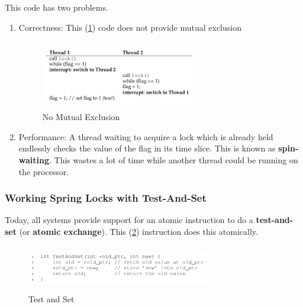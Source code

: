 This code has two problems.\\

\begin{enumerate}
    \item Correctness: This (\ref{282}) code does not provide mutual exclusion
        \begin{figure}[h!]
            \label{282}
            \begin{center}
                \includegraphics[width=7cm, height=3cm]{img/282.png}
                \caption{No Mutual Exclusion}
            \end{center}
        \end{figure}

    \item Performance: A thread waiting to acquire a lock which is already held
        endlessly checks the value of the flag in its time slice. This is known
        as \textbf{spin-waiting}. This wastes a lot of time while another thread
        could be running on the processor.
\end{enumerate}

\subsubsection{Working Spring Locks with Test-And-Set}

Today, all systems provide support for an atomic instruction to do a
\textbf{test-and-set} (or \textbf{atomic exchange}). This (\ref{testandset})
instruction does this atomically.

\begin{figure}[h!]
    \label{testandset}
    \begin{center}
        \includegraphics[width=8cm, height=2cm]{img/testandset.png}
        \caption{Test and Set}
    \end{center}
\end{figure}

